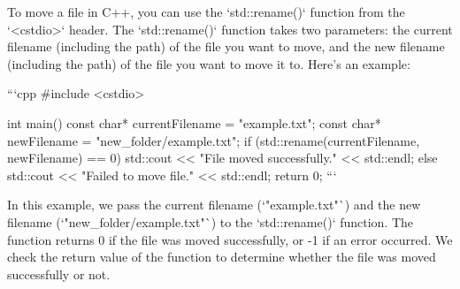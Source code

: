 To move a file in C++, you can use the `std::rename()` function from the `<cstdio>` header. The `std::rename()` function takes two parameters: the current filename (including the path) of the file you want to move, and the new filename (including the path) of the file you want to move it to. Here's an example:

```cpp
#include <cstdio>

int main() {
    const char* currentFilename = "example.txt";
    const char* newFilename = "new_folder/example.txt";
    if (std::rename(currentFilename, newFilename) == 0) {
        std::cout << "File moved successfully." << std::endl;
    }
    else {
        std::cout << "Failed to move file." << std::endl;
    }
    return 0;
}
```

In this example, we pass the current filename (`"example.txt"`) and the new filename (`"new_folder/example.txt"`) to the `std::rename()` function. The function returns 0 if the file was moved successfully, or -1 if an error occurred. We check the return value of the function to determine whether the file was moved successfully or not.
